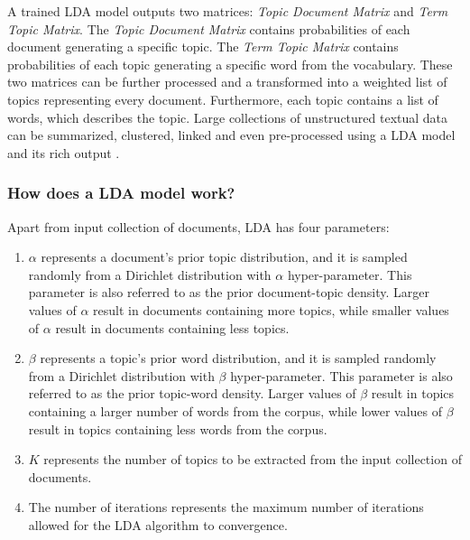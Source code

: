             A trained LDA model outputs two matrices: \emph{Topic Document Matrix} and \emph{Term Topic Matrix}. The \emph{Topic Document Matrix} contains probabilities of each document generating a specific topic. The \emph{Term Topic Matrix} contains probabilities of each topic generating a specific word from the vocabulary. These two matrices can be further processed and a transformed into a weighted list of topics representing every document. Furthermore, each topic contains a list of words, which describes the topic. Large collections of unstructured textual data can be summarized, clustered, linked and even pre-processed using a LDA model and its rich output \cite{campbell2015latent}.
        
        \subsubsection{How does a LDA model work?}
        
            Apart from input collection of documents, LDA has four parameters:
            
            \begin{enumerate}
                \item $\alpha$ represents a document’s prior topic distribution, and it is sampled randomly from a Dirichlet distribution with $\alpha$ hyper-parameter. This parameter is also referred to as the prior document-topic density. Larger values of $\alpha$ result in documents containing more topics, while smaller values of $\alpha$ result in documents containing less topics. 
                
                \item $\beta$ represents a topic’s prior word distribution, and it is sampled randomly from a Dirichlet distribution with $\beta$ hyper-parameter. This parameter is also referred to as the prior topic-word density. Larger values of $\beta$ result in topics containing a larger number of words from the corpus, while lower values of $\beta$ result in topics containing less words from the corpus.
                
                \item $K$ represents the number of topics to be extracted from the input collection of documents.
                
                \item The number of iterations represents the maximum number of iterations allowed for the LDA algorithm to convergence.
            \end{enumerate}
        
